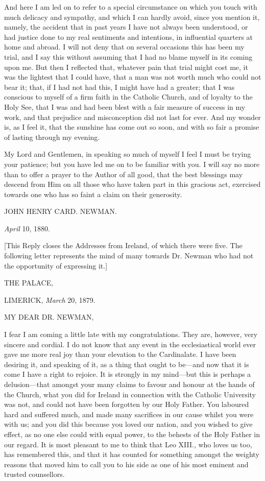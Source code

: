 And here I am led on to refer to a special circumstance on which
you touch with much delicacy and sympathy, and which I can hardly
avoid, since you mention it, namely, the accident that in past years I
have not always been understood, or had justice done to my real
sentiments and intentions, in influential quarters at home and abroad.
I will not deny that on several occasions this has been my trial, and
I say this without assuming that I had no blame myself in its coming
upon me. But then I reflected that, whatever pain that trial might
cost me, it was the lightest that I could have, that a man was not
worth much who could not bear it; that, if I had not had this, I might
have had a greater; that I was conscious to myself of a firm faith in
the Catholic Church, and of loyalty to the Holy See, that I was and
had been blest with a fair measure of success in my work, and that
prejudice and misconception did not last for ever. And my wonder is,
as I feel it, that the sunshine has come out so soon, and with so fair
a promise of lasting through my evening.

My Lord and Gentlemen, in speaking so much of myself I feel I must
be trying your patience; but you have led me on to be familiar with
you. I will say no more than to offer a prayer to the Author of all
good, that the best blessings may descend from Him on all those who
have taken part in this gracious act, exercised towards one who
has so faint a claim on their generosity.

JOHN HENRY CARD.
NEWMAN.

\emph{April} 10, 1880.

[This Reply closes the Addresses from Ireland, of which there were
five. The following letter represents the mind of many towards Dr.
Newman who had not the opportunity of expressing it.]

THE PALACE,

LIMERICK, \emph{March} 20, 1879.

MY DEAR DR.
NEWMAN,

I fear I am coming a little late with my congratulations. They are,
however, very sincere and cordial. I do not know that any event in the
ecclesiastical world ever gave me more real joy than your elevation to
the Cardinalate. I have been desiring it, and speaking of it, as a
thing that ought to be—and now that it is come I have a right to
rejoice. It is strongly in my mind—but this is perhaps a delusion—that
amongst your many claims to favour and honour at the hands of the
Church, what you did for Ireland in connection with the Catholic
University was not, and could not have been forgotten by our Holy
Father. You laboured hard and suffered much, and made many sacrifices
in our cause whilst you were with us; and you did this because you
loved our nation, and you wished to give effect, as no one else could
with equal power, to the behests of the Holy Father in our regard. It
is most pleasant to me to think that Leo XIII., who loves us too, has
remembered this, and that it has counted for something amongst the
weighty reasons that moved him to call you to his side as one of his
most eminent and trusted counsellors.

